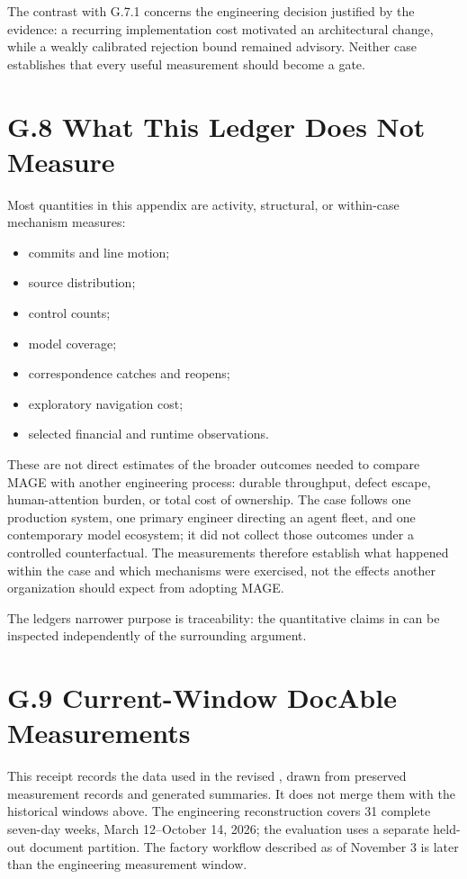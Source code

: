 The contrast with G.7.1 concerns the engineering decision justified by the evidence: a recurring implementation cost motivated an architectural change, while a weakly calibrated rejection bound remained advisory. Neither case establishes that every useful measurement should become a gate.

\section{G.8 What This Ledger Does Not Measure}\label{heading:does-not-measure}

Most quantities in this appendix are activity, structural, or within-case mechanism measures:

\begin{itemize}
\tightlist
\item
  commits and line motion;
\item
  source distribution;
\item
  control counts;
\item
  model coverage;
\item
  correspondence catches and reopens;
\item
  exploratory navigation cost;
\item
  selected financial and runtime observations.
\end{itemize}

These are not direct estimates of the broader outcomes needed to compare MAGE with another engineering process: durable throughput, defect escape, human-attention burden, or total cost of ownership. The case follows one production system, one primary engineer directing an agent fleet, and one contemporary model ecosystem; it did not collect those outcomes under a controlled counterfactual. The measurements therefore establish what happened within the case and which mechanisms were exercised, not the effects another organization should expect from adopting MAGE.

The ledger\textquotesingle s narrower purpose is traceability: the quantitative claims in  can be inspected independently of the surrounding argument.

\section{G.9 Current-Window DocAble Measurements}\label{heading:docable-seip-current-window}

This receipt records the data used in the revised , drawn from preserved measurement records and generated summaries. It does not merge them with the historical windows above. The engineering reconstruction covers 31 complete seven-day weeks, March 12--October 14, 2026; the evaluation uses a separate held-out document partition. The factory workflow described as of November 3 is later than the engineering measurement window.

